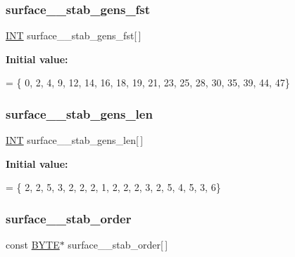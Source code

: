 \subsubsection{\texorpdfstring{surface\+\_\+\_\+stab\+\_\+gens\+\_\+fst}{surface\_25\_stab\_gens\_fst}}
{\footnotesize\ttfamily \mbox{\hyperlink{galois_8h_a09fddde158a3a20bd2dcadb609de11dc}{I\+NT}} surface\+\_\+\_\+stab\+\_\+gens\+\_\+fst\mbox{[}$\,$\mbox{]}}

{\bfseries Initial value\+:}
\begin{DoxyCode}
= \{ 0, 2, 4, 9, 12, 14, 16, 18, 19, 21, 
    23, 25, 28, 30, 35, 39, 44, 47\}
\end{DoxyCode}
\mbox{\label{surface__25_8_c_a51d956d505689d5ab5db8bb943172614}} 
\subsubsection{\texorpdfstring{surface\+\_\+\_\+stab\+\_\+gens\+\_\+len}{surface\_25\_stab\_gens\_len}}
{\footnotesize\ttfamily \mbox{\hyperlink{galois_8h_a09fddde158a3a20bd2dcadb609de11dc}{I\+NT}} surface\+\_\+\_\+stab\+\_\+gens\+\_\+len\mbox{[}$\,$\mbox{]}}

{\bfseries Initial value\+:}
\begin{DoxyCode}
= \{ 2, 2, 5, 3, 2, 2, 2, 1, 2, 2, 
    2, 3, 2, 5, 4, 5, 3, 6\}
\end{DoxyCode}
\mbox{\label{surface__25_8_c_a8f05729dcb334e37ce275a2b8bf52f0c}} 
\subsubsection{\texorpdfstring{surface\+\_\+\_\+stab\+\_\+order}{surface\_25\_stab\_order}}
{\footnotesize\ttfamily const \mbox{\hyperlink{galois_8h_ab6cc7b4aeb6ea31aba2b3fbfc83ff5e6}{B\+Y\+TE}}$\ast$ surface\+\_\+\_\+stab\+\_\+order\mbox{[}$\,$\mbox{]}}

